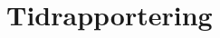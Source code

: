 \documentclass[12pt,a4paper]{article}
\begin{document}





\section{Tidrapportering}
\end{document}
